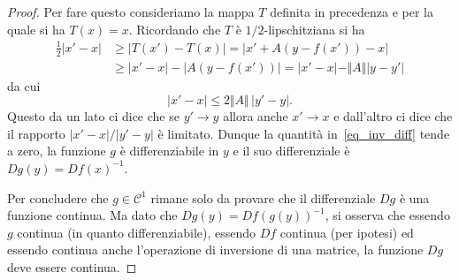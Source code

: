 \documentclass[italian]{article}
\theoremstyle{remark}
\newcommand{\CC}{{\mathcal C}}           %
\begin{document}
\begin{proof}
Per fare questo consideriamo la mappa $T$ definita in
precedenza e per la quale si ha $T(x)=x$. 
Ricordando che $T$ \`e $1/2$-lipschitziana si ha
\begin{equation}\label{erro}
\begin{aligned}
\frac 1 2 |x'-x| &\ge |T(x')-T(x)| = |x'+A(y-f(x'))-x|\\
&\ge |x'-x| - |A(y-f(x'))|
= |x'-x| - \Vert A \Vert |y-y'|
\end{aligned}
\end{equation}
da cui
\[
|x'-x| \le 2\Vert A\Vert \,|y'-y|.
\]
Questo da un lato ci dice che se $y'\to y$ allora anche $x'\to x$ e
dall'altro ci dice che il rapporto $|x'-x|/|y'-y|$ \`e limitato.
Dunque la quantit\`a in~\eqref{eq_inv_diff} tende a zero, 
la funzione $g$ \`e differenziabile in $y$ e il suo
differenziale \`e $Dg(y)=Df(x)^{-1}$.

Per concludere che $g\in \CC^1$ rimane solo da provare che il 
differenziale $Dg$ \`e una funzione continua. Ma dato che
$Dg(y)=Df(g(y))^{-1}$, si osserva che essendo $g$ continua (in quanto
differenziabile), essendo $Df$ continua (per ipotesi) ed essendo
continua anche l'operazione di inversione di una matrice, la funzione
$Dg$ deve essere continua.
\end{proof}
\end{document}
